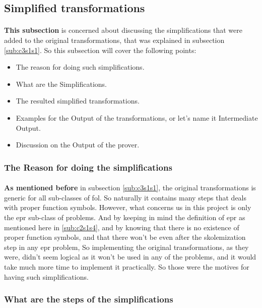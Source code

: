 \subsection{Simplified transformations}\label{sub:c3s1s2}
	\paragraph{}
	\textbf{This subsection} is concerned about discussing the simplifications that were added to the original transformations, that was explained in subsection \ref{sub:c3s1s1}. So this subsection will cover the following points:
	\begin{itemize}
		\item The reason for doing such simplifications.
		\item What are the Simplifications.
		\item The resulted simplified transformations.
		\item Examples for the Output of the transformations, or let's name it Intermediate Output.
		\item Discussion on the Output of the prover.
	\end{itemize}

	\subsubsection{The Reason for doing the simplifications}
		\paragraph{}
		\textbf{As mentioned before} in subsection \ref{sub:c3s1s1}, the original transformations is generic for all sub-classes of \ac{fol}. So naturally it contains many steps that deals with proper function symbols. However, what concerns us in this project is only the \ac{epr} sub-class of problems. And by keeping in mind the definition of \ac{epr} as mentioned here in \ref{sub:c2s1s4}, and by knowing that there is no existence of proper function symbols, and that there won't be even after the skolemization step in any \ac{epr} problem, So implementing the original transformations, as they were, didn't seem logical as it won't be used in any of the problems, and it would take much more time to implement it practically. So those were the motives for having such simplifications.
	
	\subsubsection{What are the steps of the simplifications}

